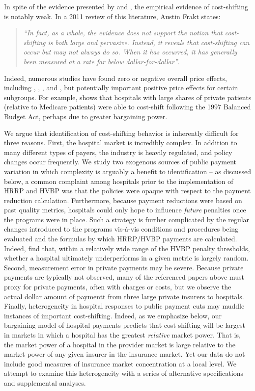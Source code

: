 \documentclass[12pt]{article}
\begin{document}
In spite of the evidence presented by \cite{cutler1998costshift} and \cite{zwanziger2006}, the empirical evidence of cost-shifting is notably weak.  In a 2011 review of this literature, Austin Frakt states:
\begin{quote}
\textit{``In fact, as a whole, the evidence does not support the notion that cost-shifting is both large and pervasive. Instead, it reveals that cost-shifting can occur but may not always do so. When it has occurred, it has generally been measured at a rate far below dollar-for-dollar''}.
\end{quote}

Indeed, numerous studies have found zero or negative overall price effects, including \cite{dranove2008impact}, \cite{wu2010}, \cite{frakt2014}, and \cite{dranove2017}, but potentially important positive price effects for certain subgroups.  For example, \cite{wu2010} shows that hospitals with large shares of private patients (relative to Medicare patients) were able to cost-shift following the 1997 Balanced Budget Act, perhaps due to greater bargaining power.

We argue that identification of cost-shifting behavior is inherently difficult for three reasons.  First, the hospital market is incredibly complex.  In addition to many different types of payers, the industry is heavily regulated, and policy changes occur frequently.  We study two exogenous sources of public payment variation in which complexity is arguably a benefit to identification -- as discussed below, a common complaint among hospitals prior to the implementation of HRRP and HVBP was that the policies were opaque with respect to the payment reduction calculation.  Furthermore, because payment reductions were based on past quality metrics, hospitals could only hope to influence \textit{future} penalties once the programs were in place. Such a strategy is further complicated by the regular changes introduced to the programs vis-\`a-vis conditions and procedures being evaluated and the formulas by which HRRP/HVBP payments are calculated. Indeed, \cite{friedson2016} find that, within a relatively wide range of the HVBP penalty thresholds, whether a hospital ultimately underperforms in a given metric is largely random. Second, measurement error in private payments may be severe.  Because private payments are typically not observed, many of the referenced papers above must proxy for private payments, often with charges or costs, but we observe the actual dollar amount of paymentt from three large private insurers to hospitals.  Finally, heterogeneity in hospital responses to public payment cuts may muddle instances of important cost-shifting.  Indeed, as we emphasize below, our bargaining model of hospital payments predicts that cost-shifting will be largest in markets in which a hospital has the greatest \textit{relative} market power.  That is, the market power of a hospital in the provider market is large relative to the market power of any given insurer in the insurance market.  Yet our data do not include good measures of insurance market concentration at a local level.  We attempt to examine this heterogeneity with a series of alternative specifications and supplemental analyses.
\end{document}
